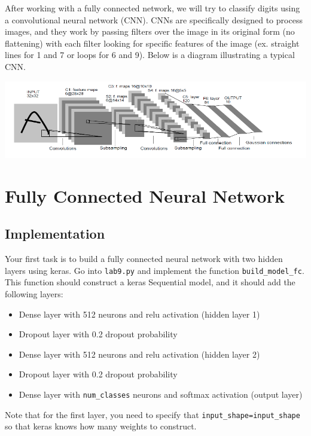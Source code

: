 \documentclass{article}
\begin{document}
After working with a fully connected network, we will try to classify digits using a convolutional neural network (CNN). CNNs are specifically designed to process images, and they work by passing filters over the image in its original form (no flattening) with each filter looking for specific features of the image (ex. straight lines for 1 and 7 or loops for 6 and 9). Below is a diagram illustrating a typical CNN.

\begin{center}
    \includegraphics[width=\textwidth]{mnist_conv.png}
\end{center}

\section{Fully Connected Neural Network}

\subsection{Implementation}

Your first task is to build a fully connected neural network with two hidden layers using keras. Go into \texttt{lab9.py} and implement the function \texttt{build\_model\_fc}. This function should construct a keras Sequential model, and it should add the following layers:

\begin{itemize}
    \item Dense layer with 512 neurons and relu activation (hidden layer 1)
    \item Dropout layer with 0.2 dropout probability
    \item Dense layer with 512 neurons and relu activation (hidden layer 2)
    \item Dropout layer with 0.2 dropout probability
    \item Dense layer with \texttt{num\_classes} neurons and softmax activation (output layer)
\end{itemize}

Note that for the first layer, you need to specify that \texttt{input\_shape=input\_shape} so that keras knows how many weights to construct.
\end{document}
